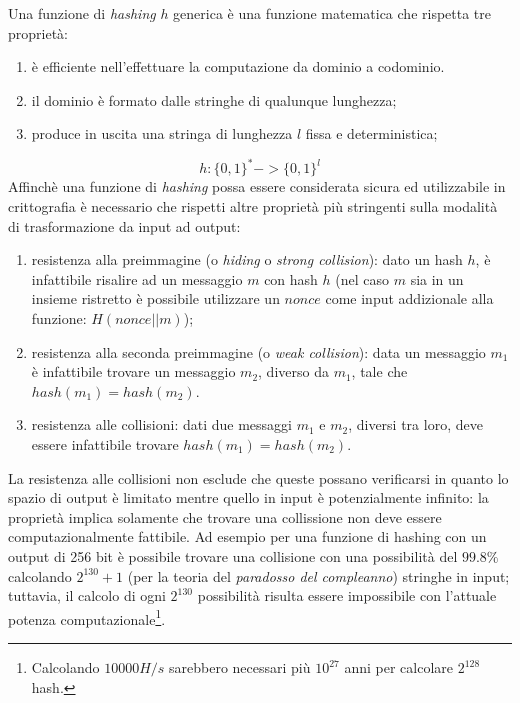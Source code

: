 Una funzione di \textit{hashing} $h$ generica è una funzione matematica che rispetta tre proprietà:

\begin{enumerate}
    \item è efficiente nell'effettuare la computazione da dominio a codominio.
    \item il dominio è formato dalle stringhe di qualunque lunghezza;
    \item produce in uscita una stringa di lunghezza $l$ fissa e deterministica;
\end{enumerate}
\begin{equation}
    h: \{0,1\}^* -> \{0,1\}^l
\end{equation}
Affinchè una funzione di \textit{hashing} possa essere considerata sicura ed utilizzabile in crittografia è necessario che rispetti altre proprietà più stringenti sulla modalità di trasformazione da input ad output:

\begin{enumerate}
    \item resistenza alla preimmagine (o \textit{hiding} o \textit{strong collision}): dato un hash $h$, è infattibile risalire ad un messaggio $m$ con hash $h$ (nel caso $m$ sia in un insieme ristretto è possibile utilizzare un $nonce$ come input addizionale alla funzione: $H(nonce || m)$);
    \item resistenza alla seconda preimmagine (o \textit{weak collision}): data un messaggio $m_1$ è infattibile trovare un messaggio $m_2$, diverso da $m_1$, tale che $hash(m_1)=hash(m_2)$.
    \item resistenza alle collisioni: dati due messaggi $m_1$ e $m_2$, diversi tra loro, deve essere infattibile trovare $hash(m_1)=hash(m_2)$.
\end{enumerate}
La resistenza alle collisioni non esclude che queste possano verificarsi in quanto lo spazio di output è limitato mentre quello in input è potenzialmente infinito: la proprietà implica solamente che trovare una collissione non deve essere computazionalmente fattibile. Ad esempio per una funzione di hashing con un output di 256 bit è possibile trovare una collisione con una possibilità del $99.8\%$ calcolando $2^{130}+1$ (per la teoria del \textit{paradosso del compleanno}) stringhe in input; tuttavia, il calcolo di ogni $2^{130}$ possibilità risulta essere impossibile con l'attuale potenza computazionale\footnote{Calcolando $10 000 H/s$ sarebbero necessari più $10^{27}$ anni per calcolare $2^{128}$ hash.}.


